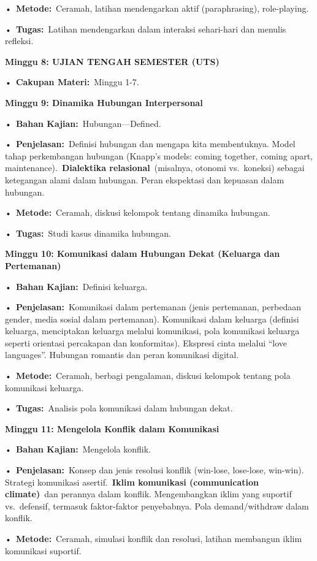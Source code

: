 \documentclass[
  letterpaper,
  DIV=11,
  numbers=noendperiod]{scrreprt}
\begin{document}
•~\textbf{Metode:}~Ceramah, latihan mendengarkan aktif (paraphrasing),
role-playing.

•~\textbf{Tugas:}~Latihan mendengarkan dalam interaksi sehari-hari dan
menulis refleksi.

\textbf{Minggu 8: UJIAN TENGAH SEMESTER (UTS)}

•~\textbf{Cakupan Materi:}~Minggu 1-7.

\textbf{Minggu 9: Dinamika Hubungan Interpersonal}

•~\textbf{Bahan Kajian:}~Hubungan---Defined.

•~\textbf{Penjelasan:}~Definisi hubungan dan mengapa kita membentuknya.
Model tahap perkembangan hubungan (Knapp's models: coming together,
coming apart, maintenance).~\textbf{Dialektika relasional}~(misalnya,
otonomi vs.~koneksi) sebagai ketegangan alami dalam hubungan. Peran
ekspektasi dan kepuasan dalam hubungan.

•~\textbf{Metode:}~Ceramah, diskusi kelompok tentang dinamika hubungan.

•~\textbf{Tugas:}~Studi kasus dinamika hubungan.

\textbf{Minggu 10: Komunikasi dalam Hubungan Dekat (Keluarga dan
Pertemanan)}

•~\textbf{Bahan Kajian:}~Definisi keluarga.

•~\textbf{Penjelasan:}~Komunikasi dalam pertemanan (jenis pertemanan,
perbedaan gender, media sosial dalam pertemanan). Komunikasi dalam
keluarga (definisi keluarga, menciptakan keluarga melalui komunikasi,
pola komunikasi keluarga seperti orientasi percakapan dan konformitas).
Ekspresi cinta melalui ``love languages''. Hubungan romantis dan peran
komunikasi digital.

•~\textbf{Metode:}~Ceramah, berbagi pengalaman, diskusi kelompok tentang
pola komunikasi keluarga.

•~\textbf{Tugas:}~Analisis pola komunikasi dalam hubungan dekat.

\textbf{Minggu 11: Mengelola Konflik dalam Komunikasi}

•~\textbf{Bahan Kajian:}~Mengelola konflik.

•~\textbf{Penjelasan:}~Konsep dan jenis resolusi konflik (win-lose,
lose-lose, win-win). Strategi komunikasi asertif.~\textbf{Iklim
komunikasi (communication climate)}~dan perannya dalam konflik.
Mengembangkan iklim yang suportif vs.~defensif, termasuk faktor-faktor
penyebabnya. Pola demand/withdraw dalam konflik.

•~\textbf{Metode:}~Ceramah, simulasi konflik dan resolusi, latihan
membangun iklim komunikasi suportif.
\end{document}
